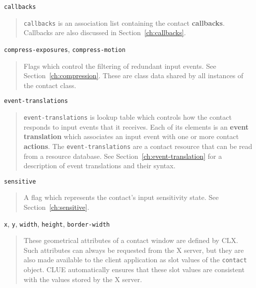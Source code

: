 \begin{flushright} \parbox[t]{6.125in}{
{\tt callbacks}
\begin{quote}
{\tt callbacks} is an association list containing the contact
{\bf callbacks}.
Callbacks are also discussed in
Section~\ref{ch:callbacks}. 
\end{quote}

}\end{flushright}


\begin{flushright} \parbox[t]{6.125in}{
{\tt compress-exposures}, {\tt compress-motion}
\begin{quote}
Flags which control the filtering of redundant input events. See
Section~\ref{ch:compression}. 
These are class data shared by all instances of the contact class.
 \end{quote}

}\end{flushright}



\begin{flushright} \parbox[t]{6.125in}{
{\tt event-translations}
\begin{quote}
{\tt event-translations} is lookup table which controls how the contact
responds to input events that it receives. Each of its elements
is an {\bf event translation} which associates
an input event with one or more contact {\bf actions}. The
{\tt event-translations} are a contact resource that can be read from a
resource database. 
See Section~\ref{ch:event-translation} for
a description of event translations and their syntax. 
\end{quote}

}\end{flushright}


\begin{flushright} \parbox[t]{6.125in}{
{\tt sensitive}
\begin{quote}
A flag which represents the contact's input sensitivity state. See
Section~\ref{ch:sensitive}. \end{quote}

}\end{flushright}



\begin{flushright} \parbox[t]{6.125in}{
{\tt x}, {\tt y}, {\tt width}, {\tt height}, {\tt border-width}
\begin{quote}
These geometrical attributes of a contact window are defined by CLX. Such
attributes can always be requested from the X server, but they are also made
available to the client application as slot values of the {\tt contact}
object. CLUE automatically ensures that these slot values are consistent with
the values stored by the X server.
\end{quote}

}\end{flushright}

